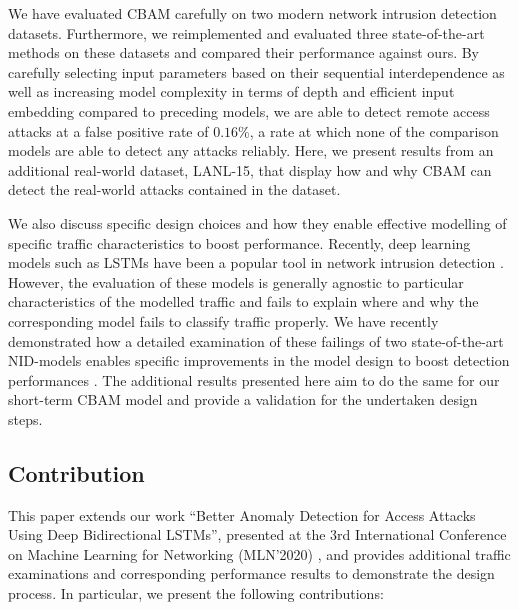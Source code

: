 We have evaluated CBAM carefully on two modern network intrusion detection datasets. Furthermore, we reimplemented and evaluated three state-of-the-art methods on these datasets and compared their performance against ours. By carefully selecting input parameters based on their sequential interdependence as well as increasing model complexity in terms of depth and efficient input embedding compared to preceding models, we are able to detect remote access attacks at a false positive rate of $0.16\%$, a rate at which none of the comparison models are able to detect any attacks reliably. 
Here, we present results from an additional real-world dataset, LANL-15, that display how and why CBAM can detect the real-world attacks contained in the dataset. 

We also discuss specific design choices and how they enable effective modelling of specific traffic characteristics to boost performance. 
Recently, deep learning models such as LSTMs have been a popular tool in network intrusion detection \cite{Bontemps2016,kim2016long,radford2018network}. However, the evaluation of these models is generally agnostic to particular characteristics of the modelled traffic and fails to explain where and why the corresponding model fails to classify traffic properly. We have recently demonstrated how a detailed examination of these failings of two state-of-the-art NID-models enables specific improvements in the model design to boost detection performances \cite{clausen2021Controlling}. The additional results presented here aim to do the same for our short-term CBAM model and provide a validation for the undertaken design steps.


\subsection{Contribution}
This paper extends our work ``Better Anomaly Detection for Access Attacks Using Deep Bidirectional LSTMs'', presented at the 3rd International Conference on Machine Learning for Networking (MLN'2020) \cite{clausen2021better}, and provides additional traffic examinations and corresponding performance results to demonstrate the design process. In particular, we present the following contributions:

